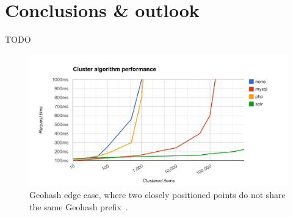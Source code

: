 
%
%

\chapter{Conclusions \& outlook}

TODO



\begin{figure}[h]
  \begin{center}
    \includegraphics[width=1.2\textwidth]{figures/geocluster_algorithm_performance.pdf}
    \caption{Geohash edge case, where two closely positioned points do not share the same Geohash prefix~\cite{Smiley11geohash}.}
    \label{fig:geohash-edge}
  \end{center}
\end{figure}